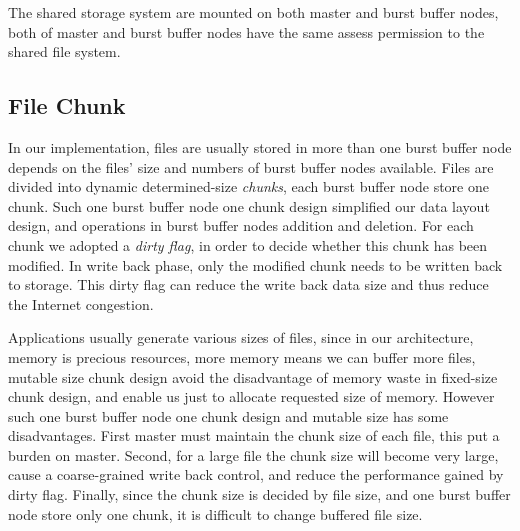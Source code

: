 The shared storage system are mounted on both master and burst buffer nodes, both of master and
burst buffer nodes have the same assess permission to the shared file system.

\subsection{File Chunk}
In our implementation, files are usually stored in more than one burst buffer node depends on the files'
size and numbers of burst buffer nodes available.
Files are divided into dynamic determined-size \emph{chunks}, each burst buffer node store one chunk.
Such one burst buffer node one chunk design simplified our data layout design, and operations in
burst buffer nodes addition and deletion.
  For each chunk
we adopted a \emph{dirty flag}, in order to decide whether this chunk has been modified.
In write back phase, only the modified chunk needs to be written back to storage.
This dirty flag can reduce the write back data size and thus reduce the Internet congestion.

Applications usually generate various sizes of files, since in our architecture, memory is precious
resources, more memory means we can buffer more files, mutable size chunk design avoid the
disadvantage of memory waste in fixed-size chunk design, and enable us just to allocate requested size of memory.
However such one burst buffer node one chunk design and mutable size has some disadvantages.
First master must maintain the chunk size of each file, this put a burden on master.
Second, for a large file the chunk size will become very large, cause a coarse-grained write back
control, and reduce the performance gained by dirty flag.
 Finally, since the chunk size is decided by
file size, and one burst buffer node store only one chunk, it is difficult to change buffered file size.

